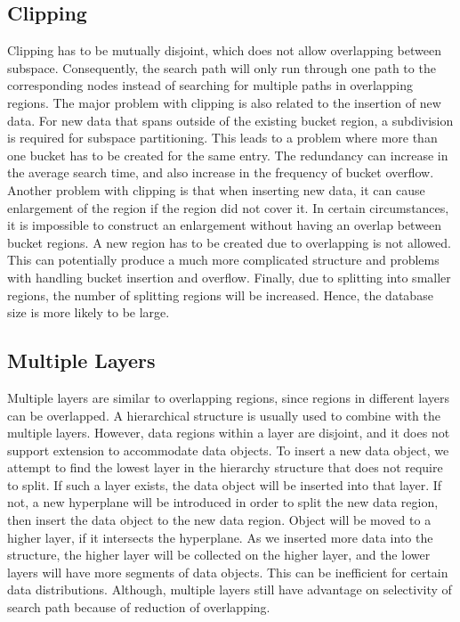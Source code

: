 \subsection{Clipping}
Clipping has to be mutually disjoint, which does not allow overlapping between subspace. Consequently, the search path will only run through one path to the corresponding nodes instead of searching for multiple paths in overlapping regions. The major problem with clipping is also related to the insertion of new data. For new data that spans outside of the existing bucket region, a subdivision is required for subspace partitioning. This leads to a problem where more than one bucket has to be created for the same entry. The redundancy \cite{Orenstein:1989wy} can increase in the average search time, and also increase in the frequency of bucket overflow. Another problem with clipping is that when inserting new data, it can cause enlargement of the region if the region did not cover it. In certain circumstances, it is impossible to construct an enlargement without having an overlap between bucket regions. A new region has to be created due to overlapping is not allowed. This can potentially produce a much more complicated structure and problems with handling bucket insertion and overflow. Finally, due to splitting into smaller regions, the number of splitting regions will be increased. Hence, the database size is more likely to be large. 

\subsection{Multiple Layers}
Multiple layers \cite{Gaede:1998fp} are similar to overlapping regions, since regions in different layers can be overlapped. A hierarchical structure is usually used to combine with the multiple layers. However, data regions within a layer are disjoint, and it does not support extension to accommodate data objects. To insert a new data object, we attempt to find the lowest layer in the hierarchy structure that does not require to split. If such a layer exists, the data object will be inserted into that layer. If not, a new hyperplane will be introduced in order to split the new data region, then insert the data object to the new data region. Object will be moved to a higher layer, if it intersects the hyperplane. As we inserted more data into the structure, the higher layer will be collected on the higher layer, and the lower layers will have more segments of data objects. This can be inefficient for certain data distributions. Although, multiple layers still have advantage on selectivity of search path because of reduction of overlapping. 



